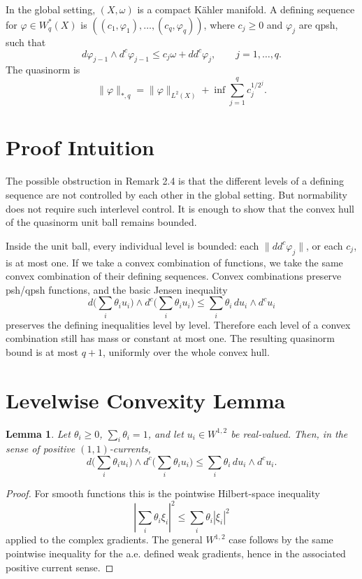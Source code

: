\documentclass[11pt]{article}
\newtheorem{lemma}{Lemma}
\newcommand{\ddc}{dd^c}
\begin{document}
In the global setting, \((X,\omega)\) is a compact K\"ahler manifold. A
defining sequence for \(\varphi\in W_q^*(X)\) is
\(((c_1,\varphi_1),\ldots,(c_q,\varphi_q))\), where \(c_j\geq0\) and
\(\varphi_j\) are qpsh, such that
\[
  d\varphi_{j-1}\wedge d^c\varphi_{j-1}
  \leq c_j\omega+\ddc\varphi_j,
  \qquad j=1,\ldots,q.
\]
The quasinorm is
\[
  \|\varphi\|_{*,q}
  =\|\varphi\|_{L^2(X)}
   +\inf \sum_{j=1}^q c_j^{1/2^j}.
\]

\section*{Proof Intuition}

The possible obstruction in Remark 2.4 is that the different levels of a
defining sequence are not controlled by each other in the global setting. But
normability does not require such interlevel control. It is enough to show
that the convex hull of the quasinorm unit ball remains bounded.

Inside the unit ball, every individual level is bounded: each
\(\|\ddc\varphi_j\|\), or each \(c_j\), is at most one. If we take a convex
combination of functions, we take the same convex combination of their
defining sequences. Convex combinations preserve psh/qpsh functions, and the
basic Jensen inequality
\[
  d\Big(\sum_i \theta_i u_i\Big)\wedge d^c\Big(\sum_i \theta_i u_i\Big)
  \leq \sum_i \theta_i\,du_i\wedge d^cu_i
\]
preserves the defining inequalities level by level. Therefore each level of a
convex combination still has mass or constant at most one. The resulting
quasinorm bound is at most \(q+1\), uniformly over the whole convex hull.

\section*{Levelwise Convexity Lemma}

\begin{lemma}
\label{lem:jensen}
Let \(\theta_i\geq0\), \(\sum_i\theta_i=1\), and let \(u_i\in W^{1,2}\) be
real-valued. Then, in the sense of positive \((1,1)\)-currents,
\[
  d\Big(\sum_i \theta_i u_i\Big)\wedge d^c\Big(\sum_i \theta_i u_i\Big)
  \leq \sum_i \theta_i\,du_i\wedge d^cu_i .
\]
\end{lemma}

\begin{proof}
For smooth functions this is the pointwise Hilbert-space inequality
\[
  \left|\sum_i \theta_i \xi_i\right|^2\leq \sum_i\theta_i|\xi_i|^2
\]
applied to the complex gradients. The general \(W^{1,2}\) case follows by
the same pointwise inequality for the a.e. defined weak gradients, hence in
the associated positive current sense.
\end{proof}
\end{document}
